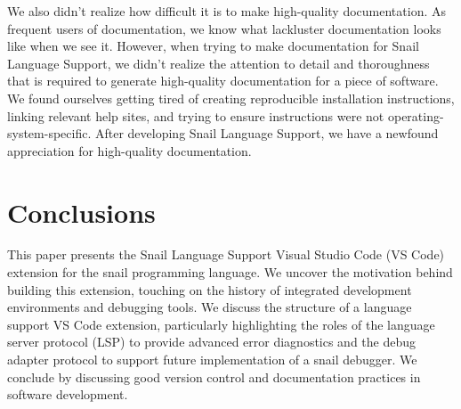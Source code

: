 \documentclass{article}
\begin{document}
We also didn't realize how difficult it is to make high-quality documentation. As frequent users of documentation, we know what lackluster documentation looks like when we see it. However, when trying to make documentation for Snail Language Support, we didn't realize the attention to detail and thoroughness that is required to generate high-quality documentation for a piece of software. We found ourselves getting tired of creating reproducible installation instructions, linking relevant help sites, and trying to ensure instructions were not operating-system-specific. After developing Snail Language Support, we have a newfound appreciation for high-quality documentation. 

\section{Conclusions}

This paper presents the Snail Language Support Visual Studio Code (VS Code) extension for the snail programming language. We uncover the motivation behind building this extension, touching on the history of integrated development environments and debugging tools. We discuss the structure of a language support VS Code extension, particularly highlighting the roles of the language server protocol (LSP) to provide advanced error diagnostics and the debug adapter protocol to support future implementation of a snail debugger. We conclude by discussing good version control and documentation practices in software development.

\newpage




\newpage
\end{document}
